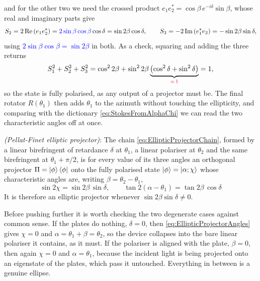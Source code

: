             and for the other two we need the crossed product $e_1e_2^{*}=\cos\beta\,e^{-i\delta}\sin\beta$, whose real and imaginary parts give
            \begin{equation*}
                S_2 = 2\,\text{Re}\left(e_1e_2^{*}\right) = \textcolor{blue}{2\sin\beta\cos\beta}\cos\delta = \sin2\beta\cos\delta, \qquad
                S_3 = -2\,\text{Im}\left(e_1^{*}e_2\right) = -\sin2\beta\sin\delta ,
            \end{equation*}
            using \textcolor{blue}{$2\sin\beta\cos\beta=\sin2\beta$} in both. As a check, squaring and adding the three returns
            \begin{equation*}
                S_1^2+S_2^2+S_3^2 = \cos^22\beta+\sin^22\beta\underbrace{\left(\cos^2\delta+\sin^2\delta\right)}_{\textcolor{red}{=\,1}} = 1 ,
            \end{equation*}
            so the state is fully polarised, as any output of a projector must be. The final rotator $R(\theta_1)$ then adds $\theta_1$ to the azimuth without touching the ellipticity, and comparing with the dictionary \ref{eq:StokesFromAlphaChi} we can read the two characteristic angles off at once.

            \begin{myteo}
                \textit{(Pellat-Finet elliptic projector)}: The chain \ref{eq:EllipticProjectorChain}, formed by a linear birefringent of retardance $\delta$ at $\theta_1$, a linear polariser at $\theta_2$ and the same birefringent at $\theta_1+\pi/2$, is for every value of its three angles an orthogonal projector $\Pi=\ket{\phi}\bra{\phi}$ onto the fully polarised state $\ket{\phi}=\ket{\alpha;\chi}$ whose characteristic angles are, writing $\beta=\theta_2-\theta_1$,
                \begin{equation}\label{eq:EllipticProjectorAngles}
                    \boxed{\;\sin2\chi = \sin2\beta\,\sin\delta, \qquad \tan2\left(\alpha-\theta_1\right) = \tan2\beta\,\cos\delta\;}
                \end{equation}
                It is therefore an elliptic projector whenever $\sin2\beta\sin\delta\neq0$.
            \end{myteo}

            Before pushing further it is worth checking the two degenerate cases against common sense. If the plates do nothing, $\delta=0$, then \ref{eq:EllipticProjectorAngles} gives $\chi=0$ and $\alpha=\theta_1+\beta=\theta_2$, so the device collapses into the bare linear polariser it contains, as it must. If the polariser is aligned with the plate, $\beta=0$, then again $\chi=0$ and $\alpha=\theta_1$, because the incident light is being projected onto an eigenstate of the plates, which pass it untouched. Everything in between is a genuine ellipse.

